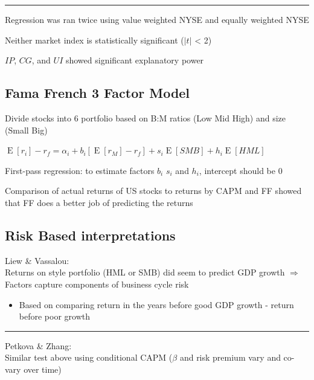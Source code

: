 \documentclass[]{book}
\providecommand{\tightlist}{%
  \setlength{\itemsep}{0pt}\setlength{\parskip}{0pt}}
\theoremstyle{definition}
\theoremstyle{definition}
\theoremstyle{remark}
\begin{document}
\begin{center}\rule{0.5\linewidth}{\linethickness}\end{center}

Regression was ran twice using value weighted NYSE and equally weighted
NYSE

Neither market index is statistically significant (\(|t|\) \textless{}
2)

\(IP\), \(CG\), and \(UI\) showed significant explanatory power

\subsection{Fama French 3 Factor
Model}\label{fama-french-3-factor-model}

Divide stocks into 6 portfolio based on B:M ratios (Low Mid High) and
size (Small Big)

\(\operatorname{E}[r_i] - r_f = \alpha_i + b_i [\operatorname{E}[r_M] - r_f] + s_i \operatorname{E}[SMB]+ h_i \operatorname{E}[HML]\)

First-pass regression: to estimate factors \(b_i\) \(s_i\) and \(h_i\),
intercept should be 0

Comparison of actual returns of US stocks to returns by CAPM and FF
showed that FF does a better job of predicting the returns

\subsection{Risk Based
interpretations}\label{risk-based-interpretations}

Liew \& Vassalou:\\
Returns on style portfolio (HML or SMB) did seem to predict GDP growth
\(\Rightarrow\) Factors capture components of business cycle risk

\begin{itemize}
\tightlist
\item
  Based on comparing return in the years before good GDP growth - return
  before poor growth
\end{itemize}

\begin{center}\rule{0.5\linewidth}{\linethickness}\end{center}

Petkova \& Zhang:\\
Similar test above using conditional CAPM (\(\beta\) and risk premium
vary and co-vary over time)
\end{document}
